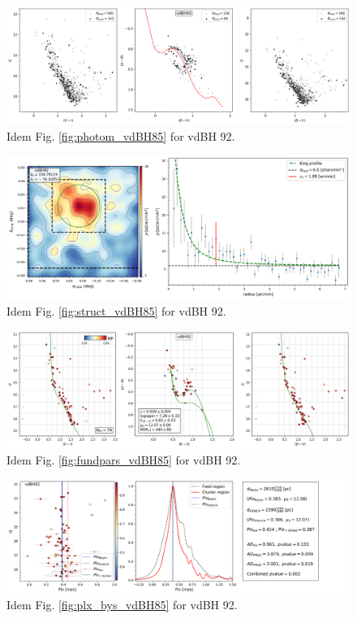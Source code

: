 \documentclass[referee]{aa}
\begin{document}
\begin{figure}[ht]
    \centering
    \includegraphics[width=\hsize]{../figs/obs_vdBH92.png}
    \caption{Idem Fig. \ref{fig:photom_vdBH85} for vdBH 92.}
    \label{fig35}
\end{figure}
\begin{figure}[ht]
    \centering
    \includegraphics[width=\hsize]{../figs/dmap_vdbh92.png}
    \caption{Idem Fig. \ref{fig:struct_vdBH85} for vdBH 92.}
    \label{fig36}
\end{figure}
\begin{figure}[ht]
    \centering
    \includegraphics[width=\hsize]{../figs/cmds_vdbh92.png}
    \caption{Idem Fig. \ref{fig:fundpars_vdBH85} for vdBH 92.}
    \label{fig37}
\end{figure}
\begin{figure}[ht]
    \centering
    \includegraphics[width=\hsize]{../figs/plx_vdBH92.png}
    \caption{Idem Fig. \ref{fig:plx_bys_vdBH85} for vdBH 92.}
    \label{fig38}
\end{figure}
\end{document}
